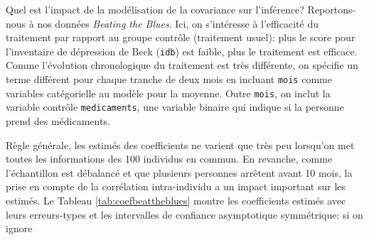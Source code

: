 \documentclass[
  11pt,
  letterpaper,
]{article}
\theoremstyle{definition}
\theoremstyle{definition}
\theoremstyle{definition}
\theoremstyle{definition}
\theoremstyle{remark}
\begin{document}
Quel est l'impact de la modélisation de la covariance sur l'inférence? Reportons-nous à nos données \emph{Beating the Blues}. Ici, on s'intéresse à l'efficacité du traitement par rapport au groupe contrôle (traitement usuel): plus le score pour l'inventaire de dépression de Beck (\texttt{idb}) est faible, plus le traitement est efficace. Comme l'évolution chronologique du traitement est très différente, on spécifie un terme différent pour chaque tranche de deux mois en incluant \texttt{mois} comme variables catégorielle au modèle pour la moyenne. Outre \texttt{mois}, on inclut la variable contrôle \texttt{medicaments}, une variable binaire qui indique si la personne prend des médicaments.

Règle générale, les estimés des coefficients ne varient que très peu lorsqu'on met toutes les informations des 100 individus en commun. En revanche, comme l'échantillon est débalancé et que plusieurs personnes arrêtent avant 10 mois, la prise en compte de la corrélation intra-individu a un impact important sur les estimés. Le Tableau \ref{tab:coefbeattheblues} montre les coefficients estimés avec leurs erreurs-types et les intervalles de confiance asymptotique symmétrique: si on ignore
\end{document}
